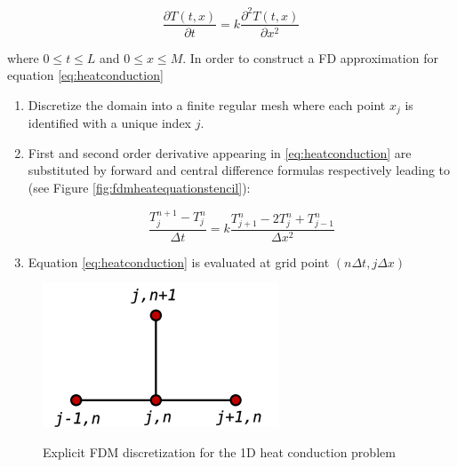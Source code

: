 \begin{equation}
    \frac{\partial T(t,x)}{\partial t}= k\frac{\partial^2
      T(t,x)}{\partial x^2}
      \label{eq:heatconduction}
\end{equation}
 
    where $0 \leq t \leq L$ and $0 \leq x \leq
    M$. 
 In order to construct a FD approximation for equation \ref{eq:heatconduction} 
 
 \begin{enumerate}
 
 \item Discretize the domain into a finite regular mesh where each point $x_j$ is identified with a unique index $j$.
    
 \item  First and second order derivative appearing in \ref{eq:heatconduction} are substituted by forward and central difference formulas respectively leading to (see Figure  \ref{fig:fdmheatequationstencil}):
 
 \begin{equation}
  \frac{T^{n+1}_{j} - T^n_{j}}{\Delta t} = k \frac{T^n_{j+1}- 2T^n_{j} + T^n_{j-1}}{\Delta x^2}
 \label{eq:discretizedheatequation}
 \end{equation}
 
 \item Equation \ref{eq:heatconduction} is evaluated at grid point $(n\Delta t, j \Delta x)$ 
    
\end{enumerate}    
    
\begin{figure}
\centering
\includegraphics[scale=0.5]{./images/CA_FDM/heatstencil}
\label{fig:fdmheatequationstencil}
\caption{Explicit FDM discretization for the 1D heat conduction problem}\label{torus}
\end{figure}    
    
